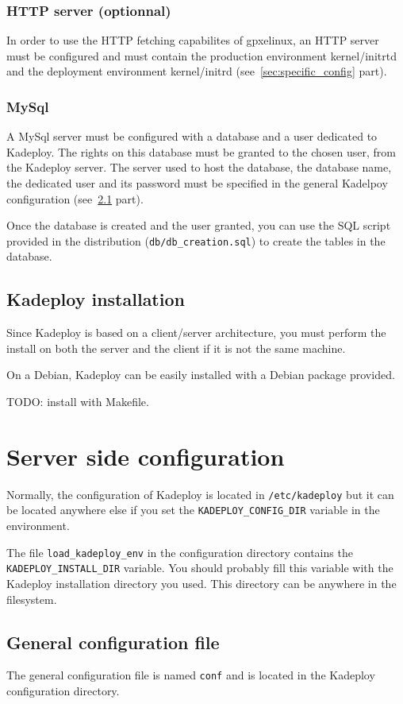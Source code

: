 \documentclass[a4wide,10pt,oneside]{book}
\begin{document}
\subsection{HTTP server (optionnal)}
In order to use the HTTP fetching capabilites of gpxelinux, an HTTP server must be configured and must contain the production environment kernel/initrtd and the deployment environment kernel/initrd (see~\ref{sec:specific_config} part).

\subsection{MySql}
A MySql server must be configured with a database and a user dedicated to Kadeploy. The rights on this database must be granted to the chosen user, from the Kadeploy server. The server used to host the database, the database name, the dedicated user and its password must be specified in the general Kadelpoy configuration (see~\ref{sec:general_config} part).

Once the database is created and the user granted, you can use the SQL script provided in the distribution (\texttt{db/db\_creation.sql}) to create the tables in the database.

\section{Kadeploy installation}
Since Kadeploy is based on a client/server architecture, you must perform the install on both the server and the client if it is not the same machine.

On a Debian, Kadeploy can be easily installed with a Debian package provided.

TODO: install with Makefile. 

\chapter{Server side configuration}
Normally, the configuration of Kadeploy is located in \texttt{/etc/kadeploy} but it can be located anywhere else if you set the \texttt{KADEPLOY\_CONFIG\_DIR} variable in the environment.

The file \texttt{load\_kadeploy\_env} in the configuration directory contains the \texttt{KADEPLOY\_INSTALL\_DIR} variable. You should probably fill this variable with the Kadeploy installation directory you used. This directory can be anywhere in the filesystem.

\section{General configuration file}\label{sec:general_config}
The general configuration file is named \texttt{conf} and is located in the Kadeploy configuration directory.
\end{document}
